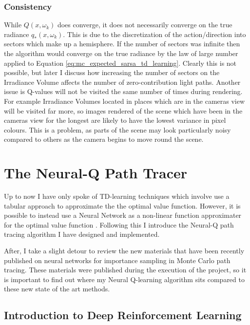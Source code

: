 \documentclass[../dissertation.tex]{subfiles}
\begin{document}
\subsubsection{Consistency}
While $Q(x, \omega_k)$ does converge, it does not necessarily converge on the true radiance $q_*(x, \omega_k)$. This is due to the discretization of the action/direction into sectors which make up a hemisphere. If the number of sectors was infinite then the algorithm would converge on the true radiance by the law of large number applied to Equation \ref{eq:mc_expected_sarsa_td_learning}. Clearly this is not possible, but later I discuss how increasing the number of  sectors on the Irradiance Volume affects the number of zero-contribution light paths. Another issue is Q-values will not be visited the same number of times during rendering. For example Irradiance Volumes located in places which are in the cameras view will be visited far more, so images rendered of the scene which have been in the cameras view for the longest are likely to have the lowest variance in pixel colours. This is a problem, as parts of the scene may look particularly noisy compared to others as the camera begins to move round the scene.

\pagebreak


\section{The Neural-Q Path Tracer}

Up to now I have only spoke of TD-learning techniques which involve use a tabular approach to approximate the the optimal value function. However, it is possible to instead use a Neural Network as a non-linear function approximater for the optimal value function \cite{deep_rl_function_approx}. Following this I introduce the Neural-Q path tracing algorithm I have designed and implemented.

After, I take a slight detour to review the new materials that have been recently published on neural networks for importance sampling in Monte Carlo path tracing. These materials were published during the execution of the project, so it is important to find out where my Neural Q-learning algorithm sits compared to these new state of the art methods.

\subsection{Introduction to Deep Reinforcement Learning}
\end{document}
